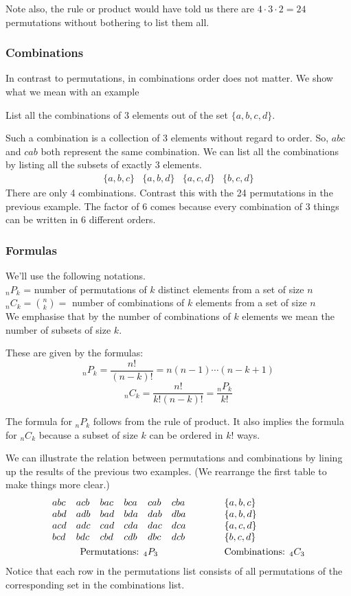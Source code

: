 Note also, the rule or product would have told us there are 
$4\cdot3\cdot2 = 24$ permutations without bothering to list them all.

\subsubsection{Combinations}
In contrast to permutations, in combinations order does not matter. 
We show what
we mean with an example

\numexamp List all the combinations of 3 elements out of the set 
$\{a,b,c,d\}$.

\ans Such a combination is a collection of 3 elements without regard to order.
So, $abc$ and $cab$ both represent the same combination. We can list all
the combinations by listing all the subsets of exactly 3 elements.
\[ \begin{array}{llllllll}
\{a,b,c\} & \{a,b,d\} & \{a,c,d\} & \{b,c,d\}
\end{array}
\]
There are only 4 combinations. Contrast this with the 24 permutations
in the previous example. The factor of 6 comes because every combination
of 3 things can be written in 6 different orders.


\subsubsection{Formulas}

We'll use the following notations.\\
$_nP_k$ = number of permutations of $k$ distinct elements from a set of size $n$ \\
$_nC_k = \binom{n}{k} =$ number of combinations of $k$ elements from a set of size $n$ \\
We emphasise that by the number of combinations of $k$ elements
we mean the number of subsets of size $k$.

These are given by the formulas:
$$_nP_k = \frac{n!}{(n-k)!} = n (n-1) \cdots (n-k+1)$$
$$_nC_k = \frac{n!}{k!(n-k)!} = \frac{_nP_k}{k!}$$

The formula for $_nP_k$ follows from the rule of product. It also implies the formula for $_nC_k$ because a subset of size $k$ can be ordered in $k!$ ways. 

We can illustrate the relation between permutations and combinations
by lining up the results of the previous two examples. (We rearrange 
the first table to make things more clear.)
\[ \begin{array}{llllllllllllllll}
abc & acb & bac & bca & cab & cba & \qquad & \{a,b,c\}\\
abd & adb & bad & bda & dab & dba & \qquad & \{a,b,d\}\\
acd & adc & cad & cda & dac & dca & \qquad & \{a,c,d\}\\
bcd & bdc & cbd & cdb & dbc & dcb & \qquad & \{b,c,d\}\\[.8ex]
\multicolumn{6}{c}{\text{Permutations: }_4P_3} && 
\text{Combinations: }_4C_3
\end{array}
\]
Notice that each row in the permutations list consists of all permutations 
of the corresponding set in the combinations list.

